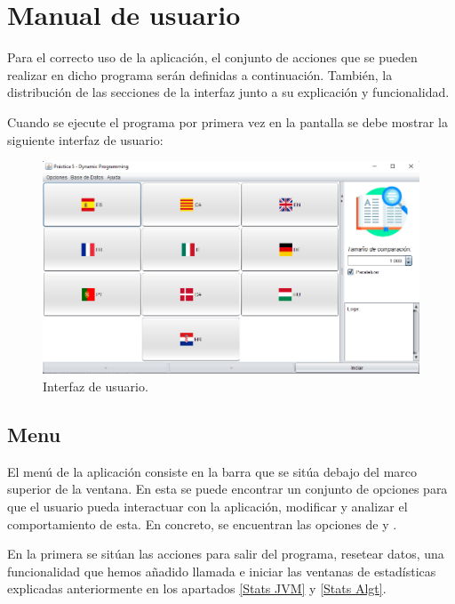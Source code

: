 \section{Manual de usuario}\label{Manual usuario}

Para el correcto uso de la aplicación, el conjunto de acciones que se pueden realizar en dicho programa serán definidas a continuación. También, la distribución de las secciones de la interfaz junto a su explicación y funcionalidad.\bigskip

Cuando se ejecute el programa por primera vez en la pantalla se debe mostrar la siguiente interfaz de usuario:

\begin{figure}[!h]
    \centering
    \includegraphics[width=\linewidth]{Usage/img/GUI.png}
    \caption{Interfaz de usuario.}
    \label{fig:User_interface}
\end{figure}

\subsection{Menu}\label{Manual usuario, Header}

El menú de la aplicación consiste en la barra que se sitúa debajo del marco superior de la ventana. En esta se puede encontrar un conjunto de opciones para que el usuario pueda interactuar con la aplicación, modificar y analizar el comportamiento de esta. En concreto, se encuentran las opciones de   y .\bigskip

En la primera se sitúan las acciones para salir del programa, resetear datos, una funcionalidad que hemos añadido llamada  e iniciar las ventanas de estadísticas explicadas anteriormente en los apartados \ref{Stats JVM} y \ref{Stats Algt}.\bigskip

